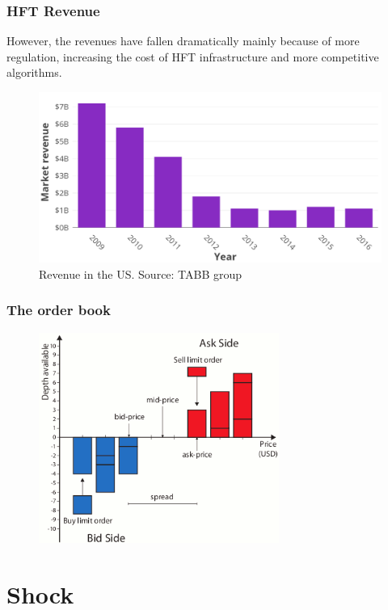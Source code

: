 \documentclass{beamer}
\begin{document}
\begin{frame}
\frametitle{HFT Revenue}
However, the revenues have fallen dramatically mainly because of more regulation, increasing the cost of HFT infrastructure and more competitive algorithms.
\begin{figure}
\includegraphics[width=0.7\paperwidth]{img/HFTmarket2}
\caption{Revenue in the US. Source: TABB group}
\end{figure}
\end{frame}

\begin{frame}
\frametitle{The order book}
\begin{figure}
\includegraphics[width=0.7\textwidth]{img/orderbook}
\end{figure}
\end{frame}

\section{Shock}
\end{document}
